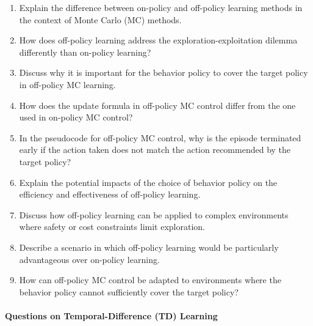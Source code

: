 \begin{enumerate}
\item Explain the difference between on-policy and off-policy learning methods in the context of Monte Carlo (MC) methods.
\item How does off-policy learning address the exploration-exploitation dilemma differently than on-policy learning?
\item Discuss why it is important for the behavior policy to cover the target policy in off-policy MC learning.
\item How does the update formula in off-policy MC control differ from the one used in on-policy MC control?
\item In the pseudocode for off-policy MC control, why is the episode terminated early if the action taken does not match the action recommended by the target policy?
\item Explain the potential impacts of the choice of behavior policy on the efficiency and effectiveness of off-policy learning.
\item Discuss how off-policy learning can be applied to complex environments where safety or cost constraints limit exploration.
\item Describe a scenario in which off-policy learning would be particularly advantageous over on-policy learning.
\item How can off-policy MC control be adapted to environments where the behavior policy cannot sufficiently cover the target policy?
\end{enumerate}

\paragraph*{Questions on Temporal-Difference (TD) Learning}

